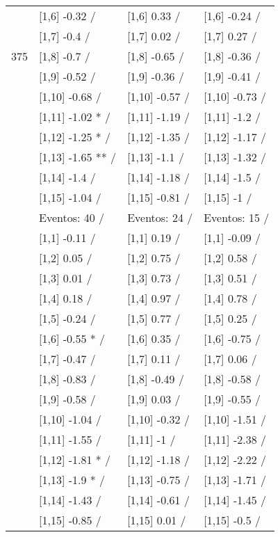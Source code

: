 \begin{table}
\begin{tabular}[t]{llll}
 & {}[1,6] -0.32  / & {}[1,6] 0.33  / & {}[1,6] -0.24  /\\
 & {}[1,7] -0.4  / & {}[1,7] 0.02  / & {}[1,7] 0.27  /\\
375 & {}[1,8] -0.7  / & {}[1,8] -0.65  / & {}[1,8] -0.36  /\\
\addlinespace
 & {}[1,9] -0.52  / & {}[1,9] -0.36  / & {}[1,9] -0.41  /\\
 & {}[1,10] -0.68  / & {}[1,10] -0.57  / & {}[1,10] -0.73  /\\
 & {}[1,11] -1.02 * / & {}[1,11] -1.19  / & {}[1,11] -1.2  /\\
 & {}[1,12] -1.25 * / & {}[1,12] -1.35  / & {}[1,12] -1.17  /\\
 & {}[1,13] -1.65 ** / & {}[1,13] -1.1  / & {}[1,13] -1.32  /\\
\addlinespace
 & {}[1,14] -1.4  / & {}[1,14] -1.18  / & {}[1,14] -1.5  /\\
 & {}[1,15] -1.04  / & {}[1,15] -0.81  / & {}[1,15] -1  /\\
 & Eventos:  40 / & Eventos:  24 / & Eventos:  15 /\\
 & {}[1,1] -0.11  / & {}[1,1] 0.19  / & {}[1,1] -0.09  /\\
 & {}[1,2] 0.05  / & {}[1,2] 0.75  / & {}[1,2] 0.58  /\\
\addlinespace
 & {}[1,3] 0.01  / & {}[1,3] 0.73  / & {}[1,3] 0.51  /\\
 & {}[1,4] 0.18  / & {}[1,4] 0.97  / & {}[1,4] 0.78  /\\
 & {}[1,5] -0.24  / & {}[1,5] 0.77  / & {}[1,5] 0.25  /\\
 & {}[1,6] -0.55 * / & {}[1,6] 0.35  / & {}[1,6] -0.75  /\\
 & {}[1,7] -0.47  / & {}[1,7] 0.11  / & {}[1,7] 0.06  /\\
\addlinespace
500 & {}[1,8] -0.83  / & {}[1,8] -0.49  / & {}[1,8] -0.58  /\\
 & {}[1,9] -0.58  / & {}[1,9] 0.03  / & {}[1,9] -0.55  /\\
 & {}[1,10] -1.04  / & {}[1,10] -0.32  / & {}[1,10] -1.51  /\\
 & {}[1,11] -1.55  / & {}[1,11] -1  / & {}[1,11] -2.38  /\\
 & {}[1,12] -1.81 * / & {}[1,12] -1.18  / & {}[1,12] -2.22  /\\
\addlinespace
 & {}[1,13] -1.9 * / & {}[1,13] -0.75  / & {}[1,13] -1.71  /\\
 & {}[1,14] -1.43  / & {}[1,14] -0.61  / & {}[1,14] -1.45  /\\
 & {}[1,15] -0.85  / & {}[1,15] 0.01  / & {}[1,15] -0.5  /\\
\bottomrule
\end{tabular}
\end{table}

